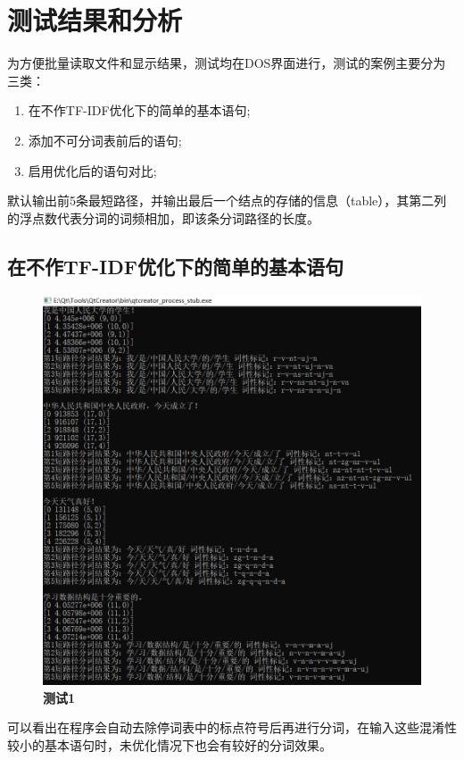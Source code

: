 \documentclass[UTF8]{ctexart}
\begin{document}
\section{测试结果和分析}
	为方便批量读取文件和显示结果，测试均在DOS界面进行，测试的案例主要分为三类：
\begin{enumerate}
\item 在不作TF-IDF优化下的简单的基本语句;
\item 添加不可分词表前后的语句;
\item 启用优化后的语句对比;
\end{enumerate}\par
	默认输出前5条最短路径，并输出最后一个结点的存储的信息（table），其第二列的浮点数代表分词的词频相加，即该条分词路径的长度。
\subsection{在不作TF-IDF优化下的简单的基本语句}
\begin{figure}[H]
\centerline{
\includegraphics[scale = .5]{test1.png}
}
\caption{\textbf{测试1}}
\end{figure}
	可以看出在程序会自动去除停词表中的标点符号后再进行分词，在输入这些混淆性较小的基本语句时，未优化情况下也会有较好的分词效果。
\end{document}
